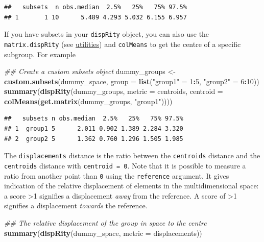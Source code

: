 \documentclass[
]{book}
\newenvironment{Shaded}{\begin{snugshade}}{\end{snugshade}}
\newcommand{\CommentTok}[1]{\textcolor[rgb]{0.56,0.35,0.01}{\textit{#1}}}
\newcommand{\DataTypeTok}[1]{\textcolor[rgb]{0.13,0.29,0.53}{#1}}
\newcommand{\DecValTok}[1]{\textcolor[rgb]{0.00,0.00,0.81}{#1}}
\newcommand{\KeywordTok}[1]{\textcolor[rgb]{0.13,0.29,0.53}{\textbf{#1}}}
\newcommand{\NormalTok}[1]{#1}
\newcommand{\OperatorTok}[1]{\textcolor[rgb]{0.81,0.36,0.00}{\textbf{#1}}}
\newcommand{\StringTok}[1]{\textcolor[rgb]{0.31,0.60,0.02}{#1}}
\begin{document}
\begin{verbatim}
##   subsets  n obs.median  2.5%   25%   75% 97.5%
## 1       1 10      5.489 4.293 5.032 6.155 6.957
\end{verbatim}

If you have subsets in your \texttt{dispRity} object, you can also use the \texttt{matrix.dispRity} (see \protect\hyperlink{utilities}{utilities}) and \texttt{colMeans} to get the centre of a specific subgroup.
For example

\begin{Shaded}
\begin{Highlighting}[]
\CommentTok{\#\# Create a custom subsets object}
\NormalTok{dummy\_groups \textless{}{-}}\StringTok{ }\KeywordTok{custom.subsets}\NormalTok{(dummy\_space,}
                               \DataTypeTok{group =} \KeywordTok{list}\NormalTok{(}\StringTok{"group1"}\NormalTok{ =}\StringTok{ }\DecValTok{1}\OperatorTok{:}\DecValTok{5}\NormalTok{,}
                                            \StringTok{"group2"}\NormalTok{ =}\StringTok{ }\DecValTok{6}\OperatorTok{:}\DecValTok{10}\NormalTok{))}
\KeywordTok{summary}\NormalTok{(}\KeywordTok{dispRity}\NormalTok{(dummy\_groups, }\DataTypeTok{metric =}\NormalTok{ centroids,}
    \DataTypeTok{centroid =} \KeywordTok{colMeans}\NormalTok{(}\KeywordTok{get.matrix}\NormalTok{(dummy\_groups, }\StringTok{"group1"}\NormalTok{))))}
\end{Highlighting}
\end{Shaded}

\begin{verbatim}
##   subsets n obs.median  2.5%   25%   75% 97.5%
## 1  group1 5      2.011 0.902 1.389 2.284 3.320
## 2  group2 5      1.362 0.760 1.296 1.505 1.985
\end{verbatim}

The \texttt{displacements} distance is the ratio between the \texttt{centroids} distance and the \texttt{centroids} distance with \texttt{centroid\ =\ 0}.
Note that it is possible to measure a ratio from another point than \texttt{0} using the \texttt{reference} argument.
It gives indication of the relative displacement of elements in the multidimensional space: a score \textgreater1 signifies a displacement \emph{away} from the reference. A score of \textgreater1 signifies a displacement \emph{towards} the reference.

\begin{Shaded}
\begin{Highlighting}[]
\CommentTok{\#\# The relative displacement of the group in space to the centre}
\KeywordTok{summary}\NormalTok{(}\KeywordTok{dispRity}\NormalTok{(dummy\_space, }\DataTypeTok{metric =}\NormalTok{ displacements))}
\end{Highlighting}
\end{Shaded}
\end{document}
